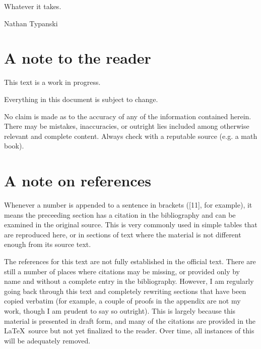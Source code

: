 Whatever it takes.

\hfill{Nathan Typanski}

\hfill \date{April 9, 2012}
\newpage
\section*{A note to the reader}
This text is a work in progress.

Everything in this document is subject to change.

No claim is made as to the accuracy of any of the information contained herein. There may be mistakes, inaccuracies, or outright lies included among otherwise relevant and complete content. Always check with a reputable source (e.g. a math book).
\newpage
\section*{A note on references}
Whenever a number is appended to a sentence in brackets ([11], for example), it means the preceeding section has a citation in the bibliography and can be examined in the original source.
This is very commonly used in simple tables that are reproduced here, or in sections of text where the material is not different enough from its source text.

The references for this text are not fully established in the official text.
There are still a number of places where citations may be missing, or provided only by name and without a complete entry in the bibliography.
However, I am regularly going back through this text and completely rewriting sections that have been copied verbatim (for example, a couple of proofs in the appendix are not my work, though I am prudent to say so outright).
This is largely because this material is presented in draft form, and many of the citations are provided in the \LaTeX\ source but not yet finalized to the reader.
Over time, all instances of this will be adequately removed.
